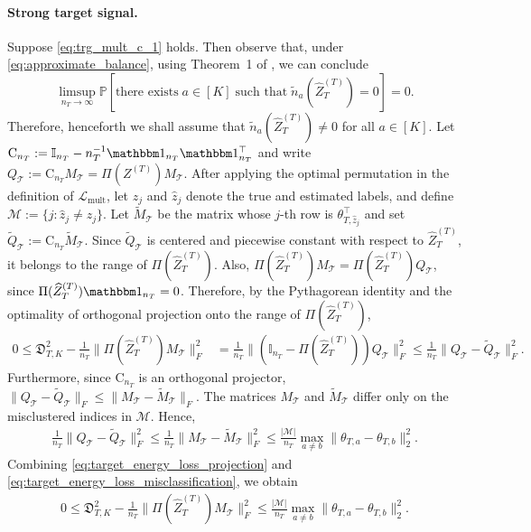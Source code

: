 \documentclass[10pt]{article}
\newcommand{\Id}{\mathbb I}
\newcommand{\wh}{\widehat}
\newcommand{\wt}{\widetilde}
\newcommand{\calT}{\mathcal T}
\newcommand{\trg}{T}
\newcommand{\nT}{n_{\trg}}
\newcommand{\Ztar}{Z^{(\trg)}}
\newcommand{\thetamcT}[1]{\theta_{\trg,#1}}
\newcommand{\hatZtar}{\wh{Z}^{(\trg)}}
\begin{document}
\paragraph{Strong target signal.}
Suppose \eqref{eq:trg_mult_c_1} holds. Then observe that, under \eqref{eq:approximate_balance}, using Theorem~1 of \cite{giraud2019partial}, we can conclude 
\[
\limsup_{\nT \to \infty}\mathbb P\left[\mbox{there exists}\; a\in [K]\;\mbox{such that}\;\wt n_a(\hatZtar_T)=0\right] = 0.
\]
Therefore, henceforth we shall assume that $\wt n_a(\hatZtar_T) \neq 0$ for all $a \in [K]$.
Let
$\mathrm C_{\nT}:=\Id_{\nT}-\nT^{-1}\mathbbm 1_{\nT}\mathbbm 1_{\nT}^\top$
and write $Q_\calT:=\mathrm C_{\nT}M_\calT=\Pi(\Ztar)M_\calT$. After applying
the optimal permutation in the definition of $\mathcal L_{\mathrm{mult}}$, let
$z_j$ and $\hat z_j$ denote the true and estimated labels, and define
$\mathcal M:=\{j:\hat z_j\neq z_j\}$. Let $\widetilde M_\calT$ be the matrix
whose $j$-th row is $\thetamcT{\hat z_j}^{\top}$ and set
$\widetilde Q_\calT:=\mathrm C_{\nT}\widetilde M_\calT$. Since
$\widetilde Q_\calT$ is centered and piecewise constant with respect to
$\hatZtar_\trg$, it belongs to the range of $\Pi(\hatZtar_\trg)$. Also,
$\Pi(\hatZtar_\trg)M_\calT=\Pi(\hatZtar_\trg)Q_\calT$, since
$\Pi(\hatZtar_\trg)\mathbbm 1_{\nT}=0$. Therefore, by the Pythagorean identity
and the optimality of orthogonal projection onto the range of
$\Pi(\hatZtar_\trg)$,
\begin{align}
\label{eq:target_energy_loss_projection}
    0\le \mathfrak D_{\trg,K}^2-\frac{1}{\nT}\|\Pi(\hatZtar_\trg)M_\calT\|_F^2
    &=\frac{1}{\nT}\|(\Id_{\nT}-\Pi(\hatZtar_\trg))Q_\calT\|_F^2
    \le \frac{1}{\nT}\|Q_\calT-\widetilde Q_\calT\|_F^2.
\end{align}
Furthermore, since $\mathrm C_{\nT}$ is an orthogonal projector,
$\|Q_\calT-\widetilde Q_\calT\|_F
\le \|M_\calT-\widetilde M_\calT\|_F$. The matrices $M_\calT$ and
$\widetilde M_\calT$ differ only on the misclustered indices in $\mathcal M$.
Hence,
\begin{align}
\label{eq:target_energy_loss_misclassification}
    \frac{1}{\nT}\|Q_\calT-\widetilde Q_\calT\|_F^2
    \le \frac{1}{\nT}\|M_\calT-\widetilde M_\calT\|_F^2
    \le \frac{|\mathcal M|}{\nT}\max_{a\neq b}\|\thetamcT{a}-\thetamcT{b}\|_2^2.
\end{align}
Combining \eqref{eq:target_energy_loss_projection} and
\eqref{eq:target_energy_loss_misclassification}, we obtain
\begin{align}
    0\le \mathfrak D_{\trg,K}^2-\frac{1}{\nT}\|\Pi(\hatZtar_\trg)M_\calT\|_F^2
    \le \frac{|\mathcal M|}{\nT}\max_{a\neq b}\|\thetamcT{a}-\thetamcT{b}\|_2^2.
\end{align}
\end{document}
